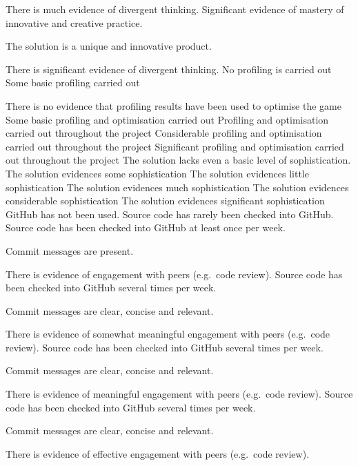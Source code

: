 \documentclass{../../fal_assignment}
\begin{document}
\begin{markingrubric}
            \par There is much evidence of divergent thinking.
        \grade Significant evidence of mastery of innovative and creative practice.
            \par The solution is a unique and innovative product.
            \par There is significant evidence of divergent thinking.
%            
        \grade\fail No profiling is carried out
        \grade Some basic profiling carried out
            \par There is no evidence that profiling results have been used to optimise the game 
        \grade Some basic profiling and optimisation carried out
        \grade Profiling and optimisation carried out throughout the project
        \grade Considerable profiling and optimisation carried out throughout the project
        \grade Significant profiling and optimisation carried out throughout the project
%
        \grade\fail The solution lacks even a basic level of sophistication.
        \grade The solution evidences some sophistication
        \grade The solution evidences little sophistication
        \grade The solution evidences much sophistication 
        \grade The solution evidences considerable sophistication
        \grade The solution evidences significant sophistication
%            
        \grade\fail GitHub has not been used.
        \grade Source code has rarely been checked into GitHub.
        \grade Source code  has been checked into GitHub at least once per week.
            \par Commit messages are present.
            \par There is evidence of engagement with peers (e.g.\ code review).
        \grade Source code  has been checked into GitHub several times per week.
            \par Commit messages are clear, concise and relevant.
            \par There is evidence of somewhat meaningful engagement with peers (e.g.\ code review).
        \grade Source code has been checked into GitHub several times per week.
            \par Commit messages are clear, concise and relevant.
            \par There is evidence of meaningful engagement with peers (e.g.\ code review).
        \grade Source code has been checked into GitHub several times per week.
            \par Commit messages are clear, concise and relevant.
            \par There is evidence of effective engagement with peers (e.g.\ code review).
%
\end{markingrubric}
\end{document}
